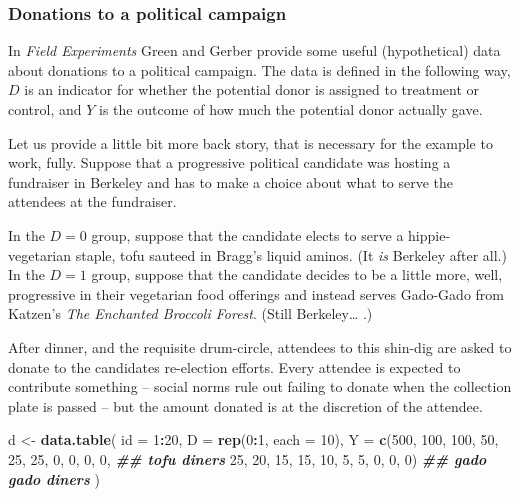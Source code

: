 \documentclass[
]{article}
\newenvironment{Shaded}{\begin{snugshade}}{\end{snugshade}}
\newcommand{\AttributeTok}[1]{\textcolor[rgb]{0.13,0.29,0.53}{#1}}
\newcommand{\DecValTok}[1]{\textcolor[rgb]{0.00,0.00,0.81}{#1}}
\newcommand{\DocumentationTok}[1]{\textcolor[rgb]{0.56,0.35,0.01}{\textbf{\textit{#1}}}}
\newcommand{\FunctionTok}[1]{\textcolor[rgb]{0.13,0.29,0.53}{\textbf{#1}}}
\newcommand{\NormalTok}[1]{#1}
\newcommand{\OtherTok}[1]{\textcolor[rgb]{0.56,0.35,0.01}{#1}}
\newcommand{\SpecialCharTok}[1]{\textcolor[rgb]{0.81,0.36,0.00}{\textbf{#1}}}
\theoremstyle{definition}
\theoremstyle{definition}
\theoremstyle{definition}
\theoremstyle{definition}
\theoremstyle{remark}
\begin{document}
\subsubsection{Donations to a political campaign}\label{donations-to-a-political-campaign}

In \emph{Field Experiments} Green and Gerber provide some useful (hypothetical) data about donations to a political campaign. The data is defined in the following way, \(D\) is an indicator for whether the potential donor is assigned to treatment or control, and \(Y\) is the outcome of how much the potential donor actually gave.

Let us provide a little bit more back story, that is necessary for the example to work, fully. Suppose that a progressive political candidate was hosting a fundraiser in Berkeley and has to make a choice about what to serve the attendees at the fundraiser.

In the \(D = 0\) group, suppose that the candidate elects to serve a hippie-vegetarian staple, tofu sauteed in Bragg's liquid aminos. (It \emph{is} Berkeley after all.) In the \(D=1\) group, suppose that the candidate decides to be a little more, well, progressive in their vegetarian food offerings and instead serves Gado-Gado from Katzen's \emph{The Enchanted Broccoli Forest}. (Still Berkeley\ldots{} .)

After dinner, and the requisite drum-circle, attendees to this shin-dig are asked to donate to the candidates re-election efforts. Every attendee is expected to contribute something -- social norms rule out failing to donate when the collection plate is passed -- but the amount donated is at the discretion of the attendee.

\begin{Shaded}
\begin{Highlighting}[]
\NormalTok{d }\OtherTok{\textless{}{-}} \FunctionTok{data.table}\NormalTok{(}
  \AttributeTok{id =} \DecValTok{1}\SpecialCharTok{:}\DecValTok{20}\NormalTok{, }
  \AttributeTok{D  =} \FunctionTok{rep}\NormalTok{(}\DecValTok{0}\SpecialCharTok{:}\DecValTok{1}\NormalTok{, }\AttributeTok{each =} \DecValTok{10}\NormalTok{), }
  \AttributeTok{Y =} \FunctionTok{c}\NormalTok{(}\DecValTok{500}\NormalTok{, }\DecValTok{100}\NormalTok{, }\DecValTok{100}\NormalTok{, }\DecValTok{50}\NormalTok{, }\DecValTok{25}\NormalTok{, }\DecValTok{25}\NormalTok{, }\DecValTok{0}\NormalTok{, }\DecValTok{0}\NormalTok{, }\DecValTok{0}\NormalTok{, }\DecValTok{0}\NormalTok{, }\DocumentationTok{\#\# tofu diners}
        \DecValTok{25}\NormalTok{,  }\DecValTok{20}\NormalTok{,  }\DecValTok{15}\NormalTok{,  }\DecValTok{15}\NormalTok{, }\DecValTok{10}\NormalTok{, }\DecValTok{5}\NormalTok{,  }\DecValTok{5}\NormalTok{, }\DecValTok{0}\NormalTok{, }\DecValTok{0}\NormalTok{, }\DecValTok{0}\NormalTok{)  }\DocumentationTok{\#\# gado gado diners}
\NormalTok{)}
\end{Highlighting}
\end{Shaded}
\end{document}
